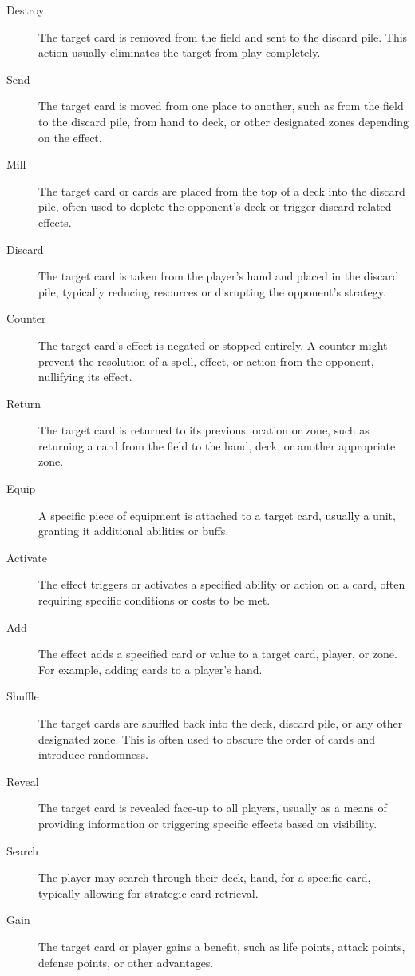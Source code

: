 \begin{description}
	\item[Destroy] The target card is removed from the field and sent to the discard pile. This action usually eliminates the target from play completely.  
	\item[Send] The target card is moved from one place to another, such as from the field to the discard pile, from hand to deck, or other designated zones depending on the effect.  
	\item[Mill] The target card or cards are placed from the top of a deck into the discard pile, often used to deplete the opponent's deck or trigger discard-related effects.  
	\item[Discard] The target card is taken from the player's hand and placed in the discard pile, typically reducing resources or disrupting the opponent’s strategy.  
	\item[Counter] The target card’s effect is negated or stopped entirely. A counter might prevent the resolution of a spell, effect, or action from the opponent, nullifying its effect.
	\item[Return] The target card is returned to its previous location or zone, such as returning a card from the field to the hand, deck, or another appropriate zone.  
	\item[Equip] A specific piece of equipment is attached to a target card, usually a unit, granting it additional abilities or buffs.  
	\item[Activate] The effect triggers or activates a specified ability or action on a card, often requiring specific conditions or costs to be met.  
	\item[Add] The effect adds a specified card or value to a target card, player, or zone. For example, adding cards to a player’s hand.  
	\item[Shuffle] The target cards are shuffled back into the deck, discard pile, or any other designated zone. This is often used to obscure the order of cards and introduce randomness.  
	\item[Reveal] The target card is revealed face-up to all players, usually as a means of providing information or triggering specific effects based on visibility.  
	\item[Search] The player may search through their deck, hand, for a specific card, typically allowing for strategic card retrieval.  
	\item[Gain] The target card or player gains a benefit, such as life points, attack points, defense points, or other advantages.  

\end{description}
